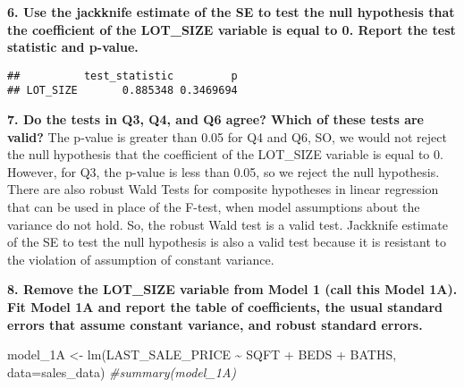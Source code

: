 \documentclass[
]{article}
\newenvironment{Shaded}{\begin{snugshade}}{\end{snugshade}}
\newcommand{\AttributeTok}[1]{\textcolor[rgb]{0.77,0.63,0.00}{#1}}
\newcommand{\CommentTok}[1]{\textcolor[rgb]{0.56,0.35,0.01}{\textit{#1}}}
\newcommand{\DecValTok}[1]{\textcolor[rgb]{0.00,0.00,0.81}{#1}}
\newcommand{\FunctionTok}[1]{\textcolor[rgb]{0.00,0.00,0.00}{#1}}
\newcommand{\NormalTok}[1]{#1}
\newcommand{\OtherTok}[1]{\textcolor[rgb]{0.56,0.35,0.01}{#1}}
\newcommand{\SpecialCharTok}[1]{\textcolor[rgb]{0.00,0.00,0.00}{#1}}
\begin{document}
\textbf{6. Use the jackknife estimate of the SE to test the null
hypothesis that the coefficient of the LOT\_SIZE variable is equal to 0.
Report the test statistic and p-value.}

\begin{Shaded}
\end{Shaded}

\begin{verbatim}
##          test_statistic         p
## LOT_SIZE       0.885348 0.3469694
\end{verbatim}

\textbf{7. Do the tests in Q3, Q4, and Q6 agree? Which of these tests
are valid?} The p-value is greater than 0.05 for Q4 and Q6, SO, we would
not reject the null hypothesis that the coefficient of the LOT\_SIZE
variable is equal to 0. However, for Q3, the p-value is less than 0.05,
so we reject the null hypothesis. There are also robust Wald Tests for
composite hypotheses in linear regression that can be used in place of
the F-test, when model assumptions about the variance do not hold. So,
the robust Wald test is a valid test. Jackknife estimate of the SE to
test the null hypothesis is also a valid test because it is resistant to
the violation of assumption of constant variance.

\textbf{8. Remove the LOT\_SIZE variable from Model 1 (call this Model
1A). Fit Model 1A and report the table of coefficients, the usual
standard errors that assume constant variance, and robust standard
errors.}

\begin{Shaded}
\begin{Highlighting}[]
\NormalTok{model\_1A }\OtherTok{\textless{}{-}} \FunctionTok{lm}\NormalTok{(LAST\_SALE\_PRICE }\SpecialCharTok{\textasciitilde{}}\NormalTok{ SQFT }\SpecialCharTok{+}\NormalTok{ BEDS }\SpecialCharTok{+}\NormalTok{ BATHS, }\AttributeTok{data=}\NormalTok{sales\_data)}
\CommentTok{\#summary(model\_1A)}
\end{Highlighting}
\end{Shaded}
\end{document}
